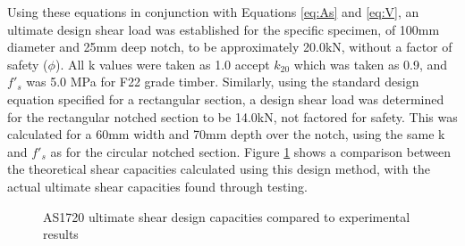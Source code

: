 \documentclass[11pt,a4paper]{article}
\numberwithin{equation}{subsection}
\begin{document}
\noindent
Using these equations in conjunction with Equations \ref{eq:As} and \ref{eq:V}, an ultimate design shear load was established for the specific specimen, of 100mm diameter and 25mm deep notch, to be approximately 20.0kN, without a factor of safety ($\phi$). All k values were taken as 1.0 accept $k_{20}$ which was taken as 0.9, and $f'_{s}$ was 5.0 MPa for F22 grade timber. Similarly, using the standard design equation specified for a rectangular section, a design shear load was determined for the rectangular notched section to be 14.0kN, not factored for safety. This was calculated for a 60mm width and 70mm depth over the notch, using the same k and $f'_{s}$ as for the circular notched section. Figure \ref{fig:Shear_Des} shows a comparison between the theoretical shear capacities calculated using this design method, with the actual ultimate shear capacities found through testing.

\vspace*{\baselineskip}

\begin{figure}[h]
	\begin{center}
	\end{center}
	\caption{AS1720 ultimate shear design capacities compared to experimental results}
	\label{fig:Shear_Des}
\end{figure}
\end{document}
